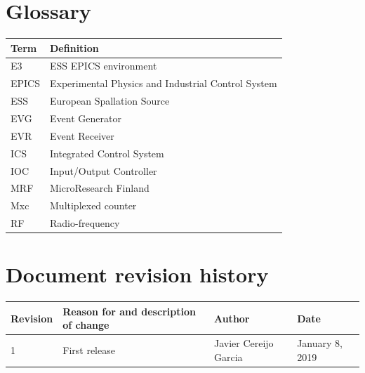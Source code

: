 \documentclass[11pt
  , a4paper
  , article
  , oneside
  , showtrims
]{memoir}
\begin{document}
\clearpage



\chapter*{Glossary}\label{sec:glossary}
\begin{table}[!htb]
  \begin{tabular}{ll}
    \toprule
    \textbf{Term} & Definition                                          \\\midrule
    E3            & ESS EPICS environment                               \\
    EPICS         & Experimental Physics and Industrial Control System  \\
    ESS           & European Spallation Source                          \\
    EVG           & Event Generator                                     \\
    EVR           & Event Receiver                                      \\
    ICS           & Integrated Control System                           \\
    IOC           & Input/Output Controller                             \\
    MRF           & MicroResearch Finland                               \\
    Mxc           & Multiplexed counter                                 \\
    RF            & Radio-frequency                                     \\
    \bottomrule
  \end{tabular}
  \label{table:glossary}
\end{table}

%
%
%

%


\chapter*{Document revision history}\label{sec:docrevhist}
\begin{table}[!htb]
  \footnotesize
  \centering
  \begin{tabular}{llll}
    \toprule
    \textbf{Revision} & \textbf{Reason for and description of change} & \textbf{Author}       & \textbf{Date} \\\midrule
    1                 & First release                                 & Javier Cereijo Garcia & January 8, 2019   \\
    \bottomrule
  \end{tabular}
  \label{table:docrevhist}
\end{table}
\end{document}
